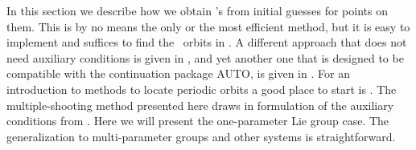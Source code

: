 In this section we describe how we obtain \rpo's from
initial guesses for points on them. This is by no means 
the only or the most efficient method, but it is easy
to implement and suffices to find the 
\KS\ orbits in . A different approach
that does not need auxiliary conditions is given in 
, and yet another one that is designed
to be compatible with the continuation package AUTO, 
is given in . For an introduction to
methods to locate periodic orbits a good place to start
is . The multiple-shooting method
presented here draws in formulation of the auxiliary
conditions from .
Here we will present the one-parameter Lie group case.
The generalization to multi-parameter groups and other systems is straightforward. 


% 
% 

